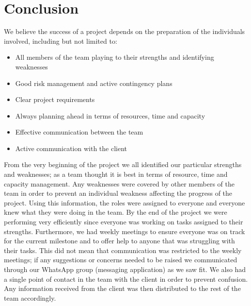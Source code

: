 \section{Conclusion}

We believe the success of a project depends on the preparation of the individuals involved, including but not limited to:
\begin{itemize}
  	\item All members of the team playing to their strengths and identifying weaknesses
	\item Good risk management and active contingency plans
	\item Clear project requirements
	\item Always planning ahead in terms of resources, time and capacity
	\item Effective communication between the team
	\item Active communication with the client
\end{itemize}

From the very beginning of the project we all identified our particular strengths and weaknesses; as a team thought it is best in terms of resource, time and capacity management. Any weaknesses were covered by other members of the team in order to prevent an individual weakness affecting the progress of the project. Using this information, the roles were assigned to everyone and everyone knew what they were doing in the team. By the end of the project we were performing very efficiently since everyone was working on tasks assigned to their strengths. Furthermore, we had weekly meetings to ensure everyone was on track for the current milestone and to offer help to anyone that was struggling with their tasks. This did not mean that communication was restricted to the weekly meetings; if any suggestions or concerns needed to be raised we communicated through our WhatsApp group (messaging application) as we saw fit. We also had a single point of contact in the team with the client in order to prevent confusion. Any information received from the client was then distributed to the rest of the team accordingly. 

